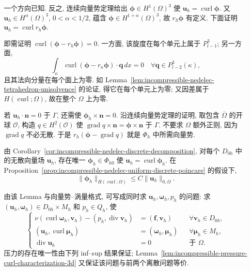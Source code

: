 \begin{Proof}
一个方向已知. 反之, 连续向量势定理给出
$\boldsymbol\phi\in H^1(\Omega)^3$ 使
$\mathbf u_h=\operatorname{curl}\boldsymbol\phi$.
又 $\mathbf u_h\in H^\alpha(\Omega)^3$, $0<\alpha<1/2$,
蕴含 $\boldsymbol\phi\in H^{1+\alpha}(\Omega)^3$,
故 $r_h\boldsymbol\phi$ 有定义.
下面证明
$\mathbf u_h=\operatorname{curl}r_h\boldsymbol\phi$.

即需证明
$\operatorname{curl}(\boldsymbol\phi-r_h\boldsymbol\phi)=0$.
一方面, 该旋度在每个单元上属于 $P_{l-1}^3$;
另一方面,
\[
\int_\kappa\operatorname{curl}(\boldsymbol\phi-r_\kappa\boldsymbol\phi)
\cdot\mathbf q\,dx=0
\quad\forall\mathbf q\in P_{l-2}^3(\kappa),
\]
且其法向分量在每个面上为零.
如 Lemma~\ref{lem:incompressible-nedelec-tetrahedron-unisolvence}
的论证, 得它在每个单元上为零;
又因差属于 $H(\operatorname{curl};\Omega)$,
故在整个 $\Omega$ 上为零.

若 $\mathbf u_h\cdot\mathbf n=0$ 于 $\Gamma$,
还需使 $\boldsymbol\phi_h\times\mathbf n=0$.
沿连续向量势定理的证明, 取包含 $\overline\Omega$ 的开球 $\mathcal O$,
构造 $q\in H^2(\mathcal O)$ 使
$\operatorname{grad}q\times\mathbf n
=\boldsymbol\phi\times\mathbf n$ 于 $\Gamma$.
不要求 $\Omega$ 额外正则, 因为 $\operatorname{grad}q$ 不必无散.
于是 $r_h(\boldsymbol\phi-\operatorname{grad}q)$
就是 $\Phi_h$ 中所需向量势.
\end{Proof}

\begin{Remark}\label{rem:incompressible-pressure-unique-discrete-potential-3d}
由 Corollary~\ref{cor:incompressible-nedelec-discrete-decomposition},
对每个 $D_{0h}$ 中的无散向量场 $\mathbf u_h$,
存在唯一 $\boldsymbol\phi_h\in\Phi_{h0}$ 使
$\mathbf u_h=\operatorname{curl}\boldsymbol\phi_h$.
在 Proposition~\ref{prop:incompressible-nedelec-uniform-discrete-poincare}
的假设下,
\[
\|\boldsymbol\phi_h\|_{H(\operatorname{curl};\Omega)}
\leq C\|\mathbf u_h\|_{0,\Omega}.
\]
\end{Remark}

由该 Lemma 与向量势--涡量格式, 可写成同时求
$\mathbf u_h,\boldsymbol\omega_h,p_h$ 的问题:
求 $(\mathbf u_h,\boldsymbol\omega_h)
\in D_{0h}\times M_h$ 和 $p_h\in Q_h$, 使
\begin{equation}\label{eq:incompressible-pressure-full-discrete-problem-3d}
\left\{
\begin{aligned}
\nu(\operatorname{curl}\boldsymbol\omega_h,\mathbf v_h)
-(p_h,\operatorname{div}\mathbf v_h)
&=(\mathbf f,\mathbf v_h)
&&\forall\mathbf v_h\in D_{0h},\\
(\mathbf u_h,\operatorname{curl}\boldsymbol\mu_h)
&=(\boldsymbol\omega_h,\boldsymbol\mu_h)
&&\forall\boldsymbol\mu_h\in M_h,\\
\operatorname{div}\mathbf u_h&=0
&&\text{于 }\Omega.
\end{aligned}
\right.
\end{equation}
压力的存在唯一性由下列 inf--sup 结果保证;
Lemma~\ref{lem:incompressible-pressure-curl-characterization-3d}
又保证该问题与前两个离散问题等价.


